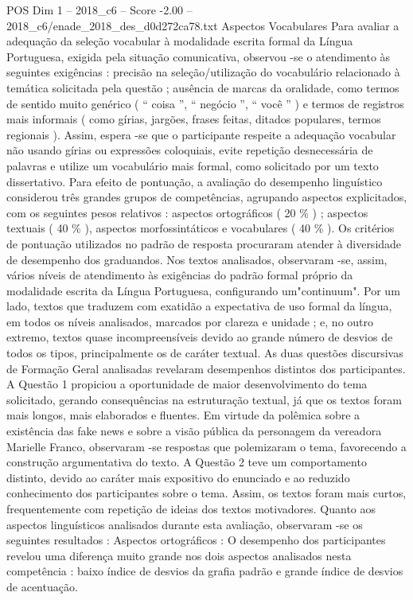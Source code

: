 \begin{textsample}{POS Dim 1 – 2018\_c6 – Score -2.00 – 2018\_c6/enade\_2018\_des\_d0d272ca78.txt}
Aspectos Vocabulares Para avaliar a adequação da seleção vocabular à modalidade escrita formal da Língua Portuguesa, exigida pela situação comunicativa, observou -se o atendimento às seguintes exigências : precisão na seleção/utilização do vocabulário relacionado à temática solicitada pela questão ; ausência de marcas da oralidade, como termos de sentido muito genérico ( “ coisa ”, “ negócio ”, “ você ” ) e termos de registros mais informais ( como gírias, jargões, frases feitas, ditados populares, termos regionais ).
Assim, espera -se que o participante respeite a adequação vocabular não usando gírias ou expressões coloquiais, evite repetição desnecessária de palavras e utilize um vocabulário mais formal, como solicitado por um texto dissertativo.
Para efeito de pontuação, a avaliação do desempenho linguístico considerou três grandes grupos de competências, agrupando aspectos explicitados, com os seguintes pesos relativos : aspectos ortográficos ( 20 \% ) ; aspectos textuais ( 40 \% ), aspectos morfossintáticos e vocabulares ( 40 \% ).
Os critérios de pontuação utilizados no padrão de resposta procuraram atender à diversidade de desempenho dos graduandos.
Nos textos analisados, observaram -se, assim, vários níveis de atendimento às exigências do padrão formal próprio da modalidade escrita da Língua Portuguesa, configurando um"continuum".
Por um lado, textos que traduzem com exatidão a expectativa de uso formal da língua, em todos os níveis analisados, marcados por clareza e unidade ; e, no outro extremo, textos quase incompreensíveis devido ao grande número de desvios de todos os tipos, principalmente os de caráter textual.
As duas questões discursivas de Formação Geral analisadas revelaram desempenhos distintos dos participantes.
A Questão 1 propiciou a oportunidade de maior desenvolvimento do tema solicitado, gerando consequências na estruturação textual, já que os textos foram mais longos, mais elaborados e fluentes.
Em virtude da polêmica sobre a existência das fake news e sobre a visão pública da personagem da vereadora Marielle Franco, observaram -se respostas que polemizaram o tema, favorecendo a construção argumentativa do texto.
A Questão 2 teve um comportamento distinto, devido ao caráter mais expositivo do enunciado e ao reduzido conhecimento dos participantes sobre o tema.
Assim, os textos foram mais curtos, frequentemente com repetição de ideias dos textos motivadores.
Quanto aos aspectos linguísticos analisados durante esta avaliação, observaram -se os seguintes resultados : Aspectos ortográficos : O desempenho dos participantes revelou uma diferença muito grande nos dois aspectos analisados nesta competência : baixo índice de desvios da grafia padrão e grande índice de desvios de acentuação.

\end{textsample}
